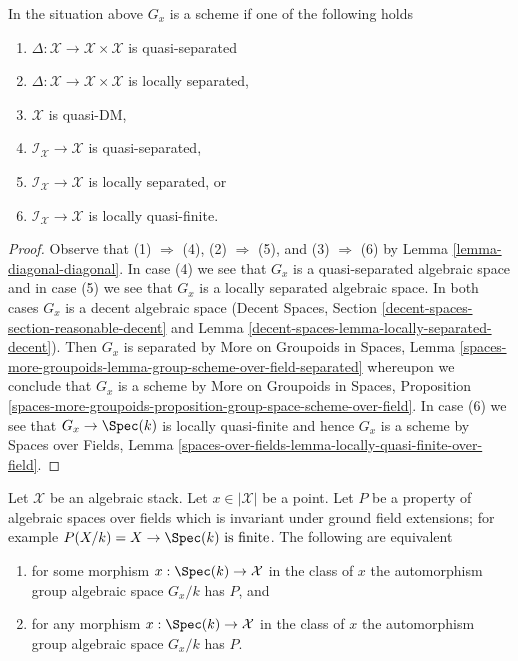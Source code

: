 \begin{lemma}
\label{lemma-automorphism-group-scheme}
In the situation above $G_x$ is a scheme if one of the following
holds
\begin{enumerate}
\item $\Delta : \mathcal{X} \to \mathcal{X} \times \mathcal{X}$
is quasi-separated
\item $\Delta : \mathcal{X} \to \mathcal{X} \times \mathcal{X}$
is locally separated,
\item $\mathcal{X}$ is quasi-DM,
\item $\mathcal{I}_\mathcal{X} \to \mathcal{X}$
is quasi-separated,
\item $\mathcal{I}_\mathcal{X} \to \mathcal{X}$
is locally separated, or
\item $\mathcal{I}_\mathcal{X} \to \mathcal{X}$
is locally quasi-finite.
\end{enumerate}
\end{lemma}

\begin{proof}
Observe that (1) $\Rightarrow$ (4), (2) $\Rightarrow$ (5), and
(3) $\Rightarrow$ (6) by
Lemma \ref{lemma-diagonal-diagonal}.
In case (4) we see that $G_x$ is a quasi-separated
algebraic space and in case (5) we see that $G_x$
is a locally separated algebraic space.
In both cases $G_x$ is a decent algebraic space
(Decent Spaces, Section \ref{decent-spaces-section-reasonable-decent} and
Lemma \ref{decent-spaces-lemma-locally-separated-decent}).
Then $G_x$ is separated by More on Groupoids in Spaces, Lemma
\ref{spaces-more-groupoids-lemma-group-scheme-over-field-separated}
whereupon we conclude that $G_x$ is a scheme by
More on Groupoids in Spaces, Proposition
\ref{spaces-more-groupoids-proposition-group-space-scheme-over-field}.
In case (6) we see that $G_x \to \Spec(k)$ is locally quasi-finite
and hence $G_x$ is a scheme by
Spaces over Fields, Lemma
\ref{spaces-over-fields-lemma-locally-quasi-finite-over-field}.
\end{proof}

\begin{lemma}
\label{lemma-property-automorphism-groups}
Let $\mathcal{X}$ be an algebraic stack. Let $x \in |\mathcal{X}|$ be a point.
Let $P$ be a property of algebraic spaces over fields which is invariant
under ground field extensions; for example
$P(X/k) = X \to \Spec(k)\text{ is finite}$.
The following are equivalent
\begin{enumerate}
\item for some morphism $x : \Spec(k) \to \mathcal{X}$ in the
class of $x$ the automorphism group algebraic space $G_x/k$
has $P$, and
\item for any morphism $x : \Spec(k) \to \mathcal{X}$ in the
class of $x$ the automorphism group algebraic space $G_x/k$
has $P$.
\end{enumerate}
\end{lemma}

